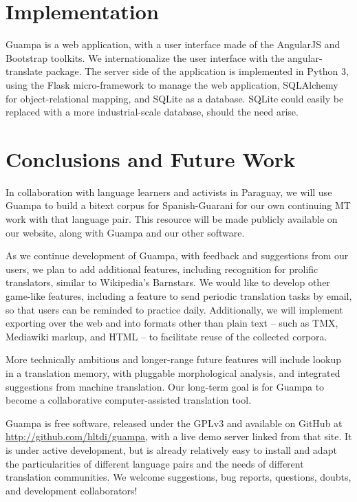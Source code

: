 \documentclass[10pt, a4paper]{article}
\begin{document}
\section{Implementation}
Guampa is a web application, with a user interface made of the AngularJS and
Bootstrap toolkits. We internationalize the user interface with the
angular-translate package. The server side of the application is implemented in
Python 3, using the Flask micro-framework to manage the web application,
SQLAlchemy for object-relational mapping, and SQLite as a database. SQLite
could easily be replaced with a more industrial-scale database, should the need
arise.

\section{Conclusions and Future Work}
In collaboration with language learners and activists in Paraguay, we will use
Guampa to build a bitext corpus for Spanish-Guarani for our own continuing MT
work with that language pair. This resource will be made publicly available on
our website, along with Guampa and our other software.

As we continue development of Guampa, with feedback and suggestions from our
users, we plan to add additional features, including recognition for prolific
translators, similar to Wikipedia's Barnstars. We would like to develop other
game-like features, including a feature to send periodic translation tasks by
email, so that users can be reminded to practice daily. Additionally, we will
implement exporting over the web and into formats other than plain text -- such
as TMX, Mediawiki markup, and HTML --  to facilitate reuse of the collected
corpora.

More technically ambitious and longer-range future features will include lookup
in a translation memory, with pluggable morphological analysis, and integrated
suggestions from machine translation. Our long-term goal is for Guampa to
become a collaborative computer-assisted translation tool.

Guampa is free software, released under the GPLv3 and available on GitHub at
\url{http://github.com/hltdi/guampa}, with a live demo server linked from that
site. It is under active development, but is already relatively easy to install
and adapt the particularities of different language pairs and the needs of
different translation communities. We
welcome suggestions, bug reports, questions, doubts, and development
collaborators!



\end{document}
